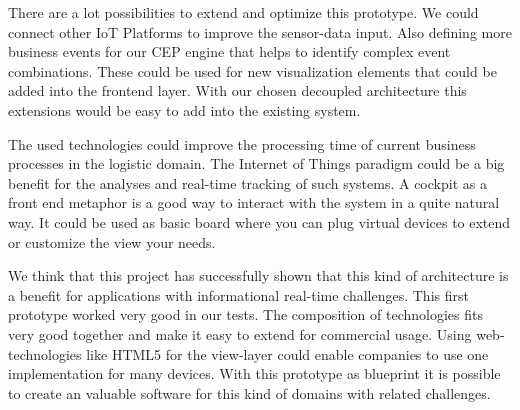\documentclass{acm_proc_article-sp}
\begin{document}
There are a lot possibilities to extend and optimize this prototype. We could connect other IoT Platforms to improve the sensor-data input. Also defining more business events for our CEP engine that helps to identify complex event combinations. These could be used for new visualization elements that could be added into the frontend layer.
With our chosen decoupled architecture this extensions would be easy to add into the existing system.

The used technologies could improve the processing time of current business processes in the logistic domain. The Internet of Things paradigm could be a big benefit for the analyses and real-time tracking of such systems. A cockpit as a front end metaphor is a good way to interact with the system in a quite natural way. It could be used as basic board where you can plug virtual devices to extend or customize the view your needs.

We think that this project has successfully shown that this kind of architecture is a benefit for applications with informational real-time challenges. This first prototype worked very good in our tests. The composition of technologies fits very good together and make it easy to extend for commercial usage. Using web-technologies like HTML5 for the view-layer could enable companies to use one implementation for many devices. 
With this prototype as blueprint it is possible to create an valuable software for this kind of domains with related challenges.


%

%
%
\end{document}
